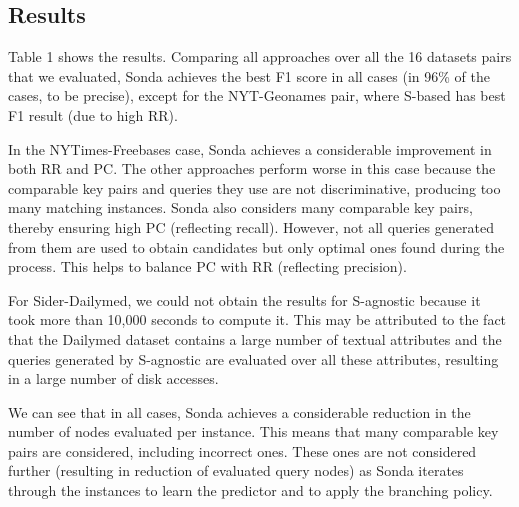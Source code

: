 \subsection{Results} 
Table 1 shows the results. Comparing all approaches over all the 16 datasets pairs that we evaluated, Sonda achieves the best F1 score in all cases (in 96\% of the cases, to be precise), except for the NYT-Geonames pair, where S-based has best F1 result (due to high RR). 
 
 
In the NYTimes-Freebases case, Sonda achieves a considerable improvement in both RR and PC. The other approaches perform worse in this case because the comparable key pairs and queries they use are not discriminative, producing too many matching instances. Sonda also considers many comparable key pairs, thereby ensuring high PC (reflecting recall). However, not all queries generated from them are used to obtain candidates but only optimal ones found during the process. This helps to balance PC with RR (reflecting precision). 

For Sider-Dailymed, we could not obtain the results for S-agnostic because it took more than 10,000 seconds to compute it. This may be attributed to the fact that the Dailymed dataset contains a large number of textual attributes and the queries generated by S-agnostic are evaluated over all these attributes, resulting in a large number of disk accesses.

We can see that in all cases, Sonda achieves a considerable reduction in the number of nodes evaluated per instance. This means that many comparable key pairs are considered, including incorrect ones. These ones are not considered further (resulting in reduction of evaluated query nodes) as Sonda iterates through the instances to learn the predictor and to apply the branching policy. 

